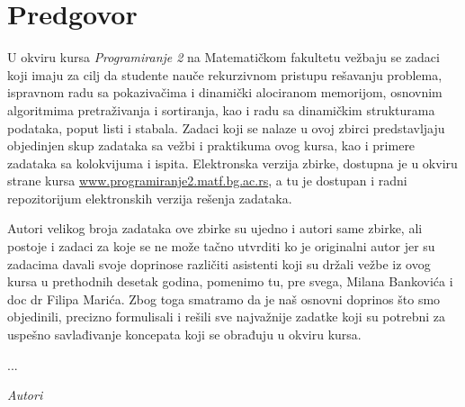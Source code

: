 
\chapter*{Predgovor}

U okviru kursa {\em Programiranje 2} na Matematičkom fakultetu vežbaju se zadaci 
koji imaju za cilj da studente nauče rekurzivnom pristupu rešavanju problema, 
ispravnom radu sa pokazivačima i dinamički alociranom memorijom,  osnovnim algoritmima 
pretraživanja i sortiranja, kao i radu sa dinamičkim strukturama podataka, 
poput listi i stabala. Zadaci koji se nalaze u ovoj zbirci predstavljaju 
objedinjen skup zadataka sa vežbi i praktikuma ovog kursa, kao i primere 
zadataka sa kolokvijuma i ispita. Elektronska verzija zbirke, dostupna je u okviru
strane kursa \url{www.programiranje2.matf.bg.ac.rs}, a tu je dostupan i radni 
repozitorijum elektronskih verzija rešenja zadataka.

Autori velikog broja zadataka ove zbirke su ujedno i autori same zbirke, ali postoje 
i zadaci za koje se ne može tačno utvrditi ko je originalni autor jer su zadacima 
davali svoje doprinose različiti asistenti koji su držali vežbe iz ovog kursa u 
prethodnih desetak godina, pomenimo tu, pre svega, Milana Bankovića i doc dr 
Filipa Marića. Zbog toga smatramo da je naš osnovni doprinos što smo objedinili, 
precizno formulisali i rešili sve najvažnije zadatke koji su potrebni za 
uspešno savlađivanje koncepata koji se obrađuju u okviru kursa. 

...





\bigskip

\begin{flushright}
{\em Autori}
\end{flushright}

